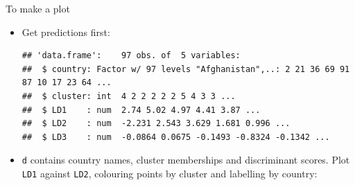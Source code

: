 \begin{frame}[fragile]{To make a plot}
  
  
  \begin{itemize}
  \item Get predictions first:
\begin{knitrout}\small
{}\color{fgcolor}\begin{kframe}
\begin{alltt}
\hlkwb{=}
\hlkwb{=}\hlstd{(}\hlopt{$}
  \hlopt{$}\hlopt{$}
\end{alltt}
\begin{verbatim}
## 'data.frame':	97 obs. of  5 variables:
##  $ country: Factor w/ 97 levels "Afghanistan",..: 2 21 36 69 91 87 10 17 23 64 ...
##  $ cluster: int  4 2 2 2 2 2 5 4 3 3 ...
##  $ LD1    : num  2.74 5.02 4.97 4.41 3.87 ...
##  $ LD2    : num  -2.231 2.543 3.629 1.681 0.996 ...
##  $ LD3    : num  -0.0864 0.0675 -0.1493 -0.8324 -0.1342 ...
\end{verbatim}
\end{kframe}
\end{knitrout}

\item \texttt{d} contains country names, cluster memberships and
  discriminant scores. Plot \texttt{LD1} against \texttt{LD2},
  colouring points by cluster and labelling by country:
  
\begin{knitrout}\small
{}\color{fgcolor}\begin{kframe}
\begin{alltt}
\hlkwb{=}\hlstd{(}\hlstd{=}
    \hlopt{+}\hlstd{()}\hlopt{+}
    \hlstd{(}\hlstd{=}\hlstd{)}\hlopt{+}\hlstd{(}
\end{alltt}
\end{kframe}
\end{knitrout}
    
  \end{itemize}
  
\end{frame}

